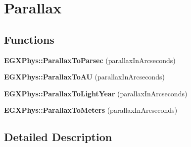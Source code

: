 \hypertarget{group___e_g_x_phys-_astrophysic-_parallax}{}\section{Parallax}
\label{group___e_g_x_phys-_astrophysic-_parallax}
\subsection*{Functions}
\begin{DoxyCompactItemize}
\item 
\mbox{\label{group___e_g_x_phys-_astrophysic-_parallax_ga48ae10af38eaeb84ac1e234fbef1cd7f}} 
{\bfseries E\+G\+X\+Phys\+::\+Parallax\+To\+Parsec} (parallax\+In\+Arcseconds)
\item 
\mbox{\label{group___e_g_x_phys-_astrophysic-_parallax_ga45c5b4322b40ec25558098800aa84113}} 
{\bfseries E\+G\+X\+Phys\+::\+Parallax\+To\+AU} (parallax\+In\+Arcseconds)
\item 
\mbox{\label{group___e_g_x_phys-_astrophysic-_parallax_ga96c8a28674c6087955a6e102d6d28dd2}} 
{\bfseries E\+G\+X\+Phys\+::\+Parallax\+To\+Light\+Year} (parallax\+In\+Arcseconds)
\item 
\mbox{\label{group___e_g_x_phys-_astrophysic-_parallax_ga744e8b930780f5513da988242f6705ec}} 
{\bfseries E\+G\+X\+Phys\+::\+Parallax\+To\+Meters} (parallax\+In\+Arcseconds)
\end{DoxyCompactItemize}


\subsection{Detailed Description}

